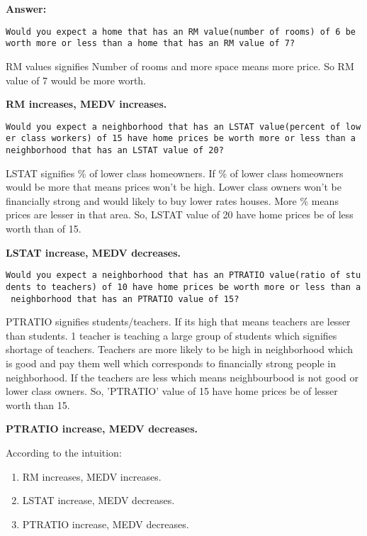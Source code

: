 \documentclass[11pt]{article}
\providecommand{\tightlist}{%
      \setlength{\itemsep}{0pt}\setlength{\parskip}{0pt}}
\begin{document}
    \textbf{Answer: }

\texttt{Would\ you\ expect\ a\ home\ that\ has\ an\ \textquotesingle{}RM\textquotesingle{}\ value(number\ of\ rooms)\ of\ 6\ be\ worth\ more\ or\ less\ than\ a\ home\ that\ has\ an\ \textquotesingle{}RM\textquotesingle{}\ value\ of\ 7?}

RM values signifies Number of rooms and more space means more price. So
RM value of 7 would be more worth.

\textbf{RM increases, MEDV increases. }

\texttt{Would\ you\ expect\ a\ neighborhood\ that\ has\ an\ \textquotesingle{}LSTAT\textquotesingle{}\ value(percent\ of\ lower\ class\ workers)\ of\ 15\ have\ home\ prices\ be\ worth\ more\ or\ less\ than\ a\ neighborhood\ that\ has\ an\ \textquotesingle{}LSTAT\textquotesingle{}\ value\ of\ 20?}

LSTAT signifies \% of lower class homeowners. If \% of lower class
homeowners would be more that means prices won't be high. Lower class
owners won't be financially strong and would likely to buy lower rates
houses. More \% means prices are lesser in that area. So, LSTAT value of
20 have home prices be of less worth than of 15.

\textbf{LSTAT increase, MEDV decreases. }

\texttt{Would\ you\ expect\ a\ neighborhood\ that\ has\ an\ \textquotesingle{}PTRATIO\textquotesingle{}\ value(ratio\ of\ students\ to\ teachers)\ of\ 10\ have\ home\ prices\ be\ worth\ more\ or\ less\ than\ a\ neighborhood\ that\ has\ an\ \textquotesingle{}PTRATIO\textquotesingle{}\ value\ of\ 15?}

PTRATIO signifies students/teachers. If its high that means teachers are
lesser than students. 1 teacher is teaching a large group of students
which signifies shortage of teachers. Teachers are more likely to be
high in neighborhood which is good and pay them well which corresponds
to financially strong people in neighborhood. If the teachers are less
which means neighbourbood is not good or lower class owners. So,
'PTRATIO' value of 15 have home prices be of lesser worth than 15.

\textbf{PTRATIO increase, MEDV decreases. }

According to the intuition:

\begin{enumerate}
\def\labelenumi{\arabic{enumi}.}
\tightlist
\item
  RM increases, MEDV increases.
\item
  LSTAT increase, MEDV decreases.
\item
  PTRATIO increase, MEDV decreases.
\end{enumerate}
\end{document}
